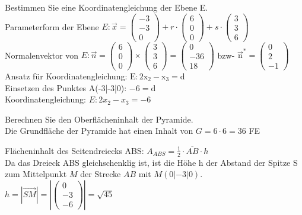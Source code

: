 \documentclass[10pt]{article}
\begin{document}
Bestimmen Sie eine Koordinatengleichung der Ebene E.\\
Parameterform der Ebene $E: \vec{x}=\left(\begin{array}{c}-3 \\ -3 \\ 0\end{array}\right)+r \cdot\left(\begin{array}{l}6 \\ 0 \\ 0\end{array}\right)+s \cdot\left(\begin{array}{l}3 \\ 3 \\ 6\end{array}\right)$\\
Normalenvektor von $E: \vec{n}=\left(\begin{array}{l}6 \\ 0 \\ 0\end{array}\right) \times\left(\begin{array}{l}3 \\ 3 \\ 6\end{array}\right)=\left(\begin{array}{c}0 \\ -36 \\ 18\end{array}\right)$ bzw- $\overrightarrow{\mathrm{n}}^{*}=\left(\begin{array}{c}0 \\ 2 \\ -1\end{array}\right)$\\
Ansatz für Koordinatengleichung: $\mathrm{E}: 2 \mathrm{x}_{2}-\mathrm{x}_{3}=\mathrm{d}$\\
Einsetzen des Punktes A(-3|-3|0): $-6=\mathrm{d}$\\
Koordinatengleichung: $E: 2 x_{2}-x_{3}=-6$

Berechnen Sie den Oberflächeninhalt der Pyramide.\\
Die Grundfläche der Pyramide hat einen Inhalt von $G=6 \cdot 6=36$ FE

Flächeninhalt des Seitendreiecks ABS: $A_{A B S}=\frac{1}{2} \cdot \overline{A B} \cdot h$\\
Da das Dreieck ABS gleichschenklig ist, ist die Höhe h der Abstand der Spitze S zum Mittelpunkt $M$ der Strecke $A B$ mit $M(0|-3| 0)$.\\
$h=|\overrightarrow{S M}|=\left|\left(\begin{array}{c}0 \\ -3 \\ -6\end{array}\right)\right|=\sqrt{45}$
\end{document}
